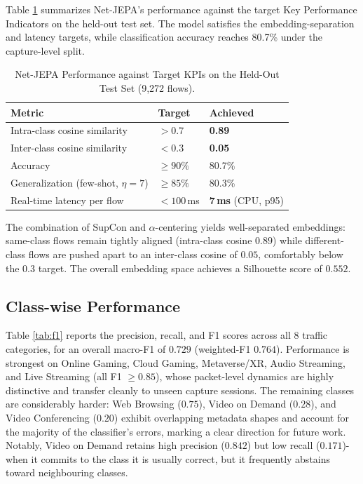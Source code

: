 \documentclass{article}
\begin{document}
Table \ref{tab:kpi} summarizes Net-JEPA's performance against the target Key Performance Indicators on the held-out test set. The model satisfies the embedding-separation and latency targets, while classification accuracy reaches 80.7\% under the capture-level split.

\begin{table}[h]
  \caption{Net-JEPA Performance against Target KPIs on the Held-Out Test Set (9,272 flows).}
  \label{tab:kpi}
  \centering
  \begin{tabular}{lll}
    \toprule
    Metric & Target & Achieved \\
    \midrule
    Intra-class cosine similarity & $> 0.7$ & \textbf{0.89} \\
    Inter-class cosine similarity & $< 0.3$ & \textbf{0.05} \\
    Accuracy & $\ge 90\%$ & 80.7\% \\
    Generalization (few-shot, $\eta=7$) & $\ge 85\%$ & 80.3\% \\
    Real-time latency per flow & $< 100$\,ms & \textbf{7\,ms} (CPU, p95) \\
    \bottomrule
  \end{tabular}
\end{table}

The combination of SupCon and $\alpha$-centering yields well-separated embeddings: same-class flows remain tightly aligned (intra-class cosine $0.89$) while different-class flows are pushed apart to an inter-class cosine of $0.05$, comfortably below the $0.3$ target. The overall embedding space achieves a Silhouette score of $0.552$.

\subsection{Class-wise Performance}

Table \ref{tab:f1} reports the precision, recall, and F1 scores across all 8 traffic categories, for an overall macro-F1 of $0.729$ (weighted-F1 $0.764$). Performance is strongest on Online Gaming, Cloud Gaming, Metaverse/XR, Audio Streaming, and Live Streaming (all F1 $\ge 0.85$), whose packet-level dynamics are highly distinctive and transfer cleanly to unseen capture sessions. The remaining classes are considerably harder: Web Browsing ($0.75$), Video on Demand ($0.28$), and Video Conferencing ($0.20$) exhibit overlapping metadata shapes and account for the majority of the classifier's errors, marking a clear direction for future work. Notably, Video on Demand retains high precision ($0.842$) but low recall ($0.171$)-when it commits to the class it is usually correct, but it frequently abstains toward neighbouring classes.
\end{document}
